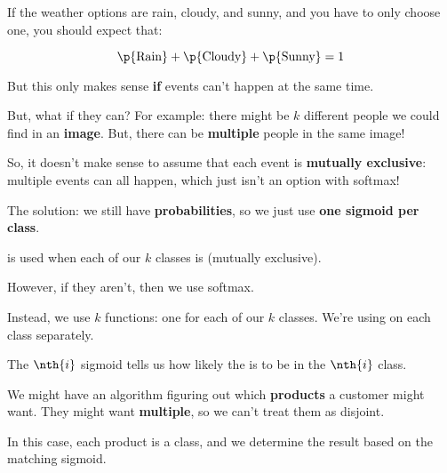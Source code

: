             \miniex If the weather options are rain, cloudy, and sunny, and you have to only choose one, you should expect that:

            \begin{equation}
                \p{\text{Rain}} + \p{\text{Cloudy}} + \p{\text{Sunny}} = 1
            \end{equation}

            But this only makes sense \textbf{if} events can't happen at the same time.

            But, what if they can? For example: there might be $k$ different people we could find in an \textbf{image}. But, there can be \textbf{multiple} people in the same image! 

            So, it doesn't make sense to assume that each event is \textbf{mutually exclusive}: multiple events can all happen, which just isn't an option with softmax!

            The solution: we still have \textbf{probabilities}, so we just use \textbf{one sigmoid per class}.\\

            \begin{clarification}
                 is used when each of our $k$ classes is  (mutually exclusive).

                However, if they aren't, then we  use softmax.

                Instead, we use $k$  functions: one for each of our $k$ classes. We're using  on each class separately.

                The $\nth{i}$ sigmoid tells us how likely the  is to be in the $\nth{i}$ class.
            \end{clarification}

            \miniex We might have an algorithm figuring out which \textbf{products} a customer might want. They might want \textbf{multiple}, so we can't treat them as disjoint.

            In this case, each product is a class, and we determine the result based on the matching sigmoid.

    